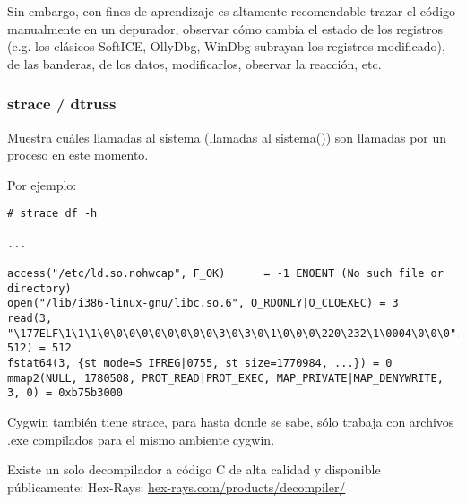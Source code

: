 Sin embargo, con fines de aprendizaje es altamente recomendable trazar el c\'odigo manualmente en un depurador,
observar c\'omo cambia el estado de los registros (e.g. los cl\'asicos SoftICE, OllyDbg, WinDbg subrayan los registros modificado),
de las banderas, de los datos, modificarlos, observar la reacci\'on, etc.


\label{strace}
\subsubsection{strace / dtruss}

Muestra cu\'ales llamadas al sistema (llamadas al sistema()) son llamadas por un proceso en este momento.

Por ejemplo:

\begin{lstlisting}
# strace df -h

...

access("/etc/ld.so.nohwcap", F_OK)      = -1 ENOENT (No such file or directory)
open("/lib/i386-linux-gnu/libc.so.6", O_RDONLY|O_CLOEXEC) = 3
read(3, "\177ELF\1\1\1\0\0\0\0\0\0\0\0\0\3\0\3\0\1\0\0\0\220\232\1\0004\0\0\0"..., 512) = 512
fstat64(3, {st_mode=S_IFREG|0755, st_size=1770984, ...}) = 0
mmap2(NULL, 1780508, PROT_READ|PROT_EXEC, MAP_PRIVATE|MAP_DENYWRITE, 3, 0) = 0xb75b3000
\end{lstlisting}

\myindex{\MacOSX}
%
%
%
\PTBRph{}%
\DEph{}\PLph{}%
\ITph{}

Cygwin tambi\'en tiene strace, para hasta donde se sabe, s\'olo trabaja con archivos .exe
compilados para el mismo ambiente cygwin.


Existe un solo decompilador a c\'odigo C de alta calidad y disponible p\'ublicamente: Hex-Rays:
\href{https://www.hex-rays.com/products/decompiler/}{hex-rays.com/products/decompiler/}




